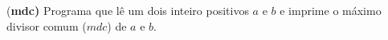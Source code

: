 \item{(\bf mdc)}
		Programa que lê um dois inteiro positivos $a$ e $b$ e imprime o 
    máximo divisor comum ($mdc$) de $a$ e $b$.

